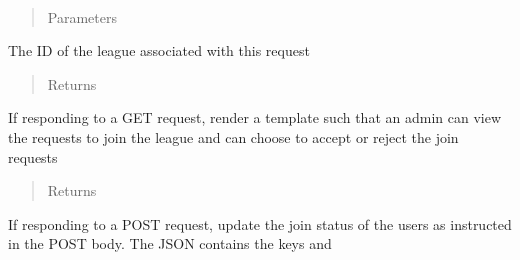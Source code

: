 \documentclass[letterpaper,10pt,english]{sphinxmanual}
\begin{document}
\begin{fulllineitems}
\label{\detokenize{tiger_leagues/readme:tiger_leagues.admin.manage_members}}~\begin{quote}\begin{description}
\item[{Parameters}] \leavevmode
{} \textendash{} 

\end{description}\end{quote}

The ID of the league associated with this request
\begin{quote}\begin{description}
\item[{Returns}] \leavevmode
{}

\end{description}\end{quote}

If responding to a GET request, render a template such that an admin can 
view the requests to join the league and can choose to accept or reject the 
join requests
\begin{quote}\begin{description}
\item[{Returns}] \leavevmode
{}

\end{description}\end{quote}

If responding to a POST request, update the join status of the users as 
instructed in the POST body. The JSON contains the keys  and 

\end{fulllineitems}

\end{document}
